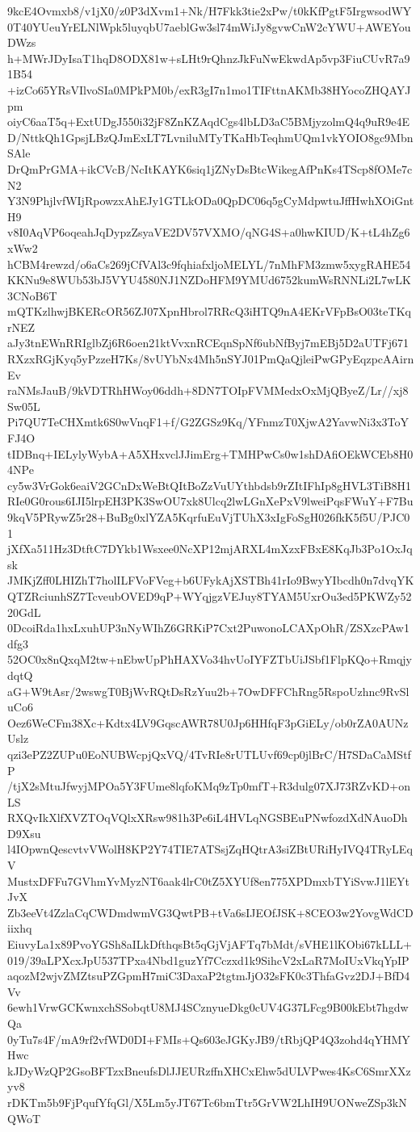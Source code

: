 9kcE4Ovmxb8/v1jX0/z0P3dXvm1+Nk/H7Fkk3tie2xPw/t0kKfPgtF5IrgwsodWY
0T40YUeuYrELNlWpk5luyqbU7aeblGw3sl74mWiJy8gvwCnW2cYWU+AWEYouDWzs
h+MWrJDyIsaT1hqD8ODX81w+sLHt9rQhnzJkFuNwEkwdAp5vp3FiuCUvR7a91B54
+izCo65YRsVIlvoSIa0MPkPM0b/exR3gI7n1mo1TIFttnAKMb38HYocoZHQAYJpm
oiyC6aaT5q+ExtUDgJ550i32jF8ZnKZAqdCgs4lbLD3aC5BMjyzolmQ4q9uR9e4E
D/NttkQh1GpsjLBzQJmExLT7LvniluMTyTKaHbTeqhmUQm1vkYOIO8gc9MbnSAle
DrQmPrGMA+ikCVcB/NcItKAYK6siq1jZNyDsBtcWikegAfPnKs4TScp8fOMe7cN2
Y3N9PhjlvfWIjRpowzxAhEJy1GTLkODa0QpDC06q5gCyMdpwtuJffHwhXOiGntH9
v8I0AqVP6oqeahJqDypzZsyaVE2DV57VXMO/qNG4S+a0hwKIUD/K+tL4hZg6xWw2
hCBM4rewzd/o6aCs269jCfVAl3c9fqhiafxljoMELYL/7nMhFM3zmw5xygRAHE54
KKNu9e8WUb53bJ5VYU4580NJ1NZDoHFM9YMUd6752kumWsRNNLi2L7wLK3CNoB6T
mQTKzlhwjBKERcOR56ZJ07XpnHbrol7RRcQ3iHTQ9nA4EKrVFpBsO03teTKqrNEZ
aJy3tnEWnRRIglbZj6R6oen21ktVvxnRCEqnSpNf6ubNfByj7mEBj5D2aUTFj671
RXzxRGjKyq5yPzzeH7Ks/8vUYbNx4Mh5nSYJ01PmQaQjleiPwGPyEqzpcAAirnEv
raNMsJauB/9kVDTRhHWoy06ddh+8DN7TOIpFVMMedxOxMjQByeZ/Lr//xj8Sw05L
Pi7QU7TeCHXmtk6S0wVnqF1+f/G2ZGSz9Kq/YFnmzT0XjwA2YavwNi3x3ToYFJ4O
tIDBnq+IELylyWybA+A5XHxvclJJimErg+TMHPwCs0w1shDAfiOEkWCEb8H04NPe
cy5w3VrGok6eaiV2GCnDxWeBtQItBoZzVuUYthbdsb9rZItIFhIp8gHVL3TiB8H1
RIe0G0rous6IJI5lrpEH3PK3SwOU7xk8Ulcq2lwLGnXePxV9lweiPqsFWuY+F7Bu
9kqV5PRywZ5r28+BuBg0xlYZA5KqrfuEuVjTUhX3xIgFoSgH026fkK5f5U/PJC01
jXfXa511Hz3DtftC7DYkb1Wsxee0NcXP12mjARXL4mXzxFBxE8KqJb3Po1OxJqsk
JMKjZff0LHIZhT7holILFVoFVeg+b6UFykAjXSTBh41rIo9BwyYIbcdh0n7dvqYK
QTZRciunhSZ7TcveubOVED9qP+WYqjgzVEJuy8TYAM5UxrOu3ed5PKWZy5220GdL
0DcoiRda1hxLxuhUP3nNyWIhZ6GRKiP7Cxt2PuwonoLCAXpOhR/ZSXzcPAw1dfg3
52OC0x8nQxqM2tw+nEbwUpPhHAXVo34hvUoIYFZTbUiJSbf1FlpKQo+RmqjydqtQ
aG+W9tAsr/2wswgT0BjWvRQtDsRzYuu2b+7OwDFFChRng5RspoUzhnc9RvSluCo6
Oez6WeCFm38Xc+Kdtx4LV9GqscAWR78U0Jp6HHfqF3pGiELy/ob0rZA0AUNzUslz
qzi3ePZ2ZUPu0EoNUBWcpjQxVQ/4TvRIe8rUTLUvf69cp0jlBrC/H7SDaCaMStfP
/tjX2sMtuJfwyjMPOa5Y3FUme8lqfoKMq9zTp0mfT+R3dulg07XJ73RZvKD+onLS
RXQvIkXlfXVZTOqVQlxXRsw981h3Pe6iL4HVLqNGSBEuPNwfozdXdNAuoDhD9Xsu
l4IOpwnQescvtvVWolH8KP2Y74TIE7ATSsjZqHQtrA3siZBtURiHyIVQ4TRyLEqV
MustxDFFu7GVhmYvMyzNT6aak4lrC0tZ5XYUf8en775XPDmxbTYiSvwJ1lEYtJvX
Zb3eeVt4ZzlaCqCWDmdwmVG3QwtPB+tVa6sIJEOfJSK+8CEO3w2YovgWdCDiixhq
EiuvyLa1x89PvoYGSh8aILkDfthqsBt5qGjVjAFTq7bMdt/sVHE1lKObi67kLLL+
019/39aLPXcxJpU537TPxa4Nbd1guzYf7Cczxd1k9SihcV2xLaR7MoIUxVkqYpIP
aqozM2wjvZMZtsuPZGpmH7miC3DaxaP2tgtmJjO32sFK0c3ThfaGvz2DJ+BfD4Vv
6ewh1VrwGCKwnxchSSobqtU8MJ4SCznyueDkg0cUV4G37LFcg9B00kEbt7hgdwQa
0yTu7s4F/mA9rf2vfWD0DI+FMIs+Qs603eJGKyJB9/tRbjQP4Q3zohd4qYHMYHwc
kJDyWzQP2GsoBFTzxBneufsDlJJEURzffnXHCxEhw5dULVPwes4KsC6SmrXXzyv8
rDKTm5b9FjPqufYfqGl/X5Lm5yJT67Tc6bmTtr5GrVW2LhIH9UONweZSp3kNQWoT
